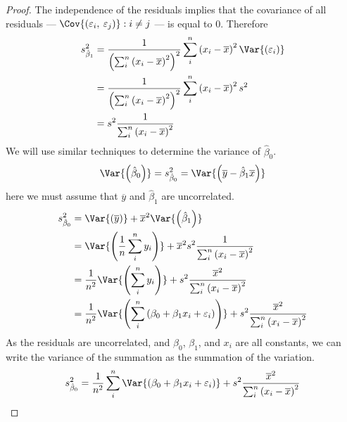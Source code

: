 \documentclass{article}
\begin{document}
\begin{proof}
    The independence of the residuals implies that the covariance of all residuals --- \(\Cov{\left( \varepsilon_i,\: \varepsilon_j \right)}:i \neq j\) --- is equal to 0. Therefore
    \begin{align*}
        s_{\hat{\beta}_1}^2 & = \frac{1}{\left( \sum_i^n \left( x_i - \overline{x} \right)^2 \right)^2} \sum_i^n \left( x_i - \overline{x} \right)^2 \Var{\left( \varepsilon_i \right)} \\
                            & = \frac{1}{\left( \sum_i^n \left( x_i - \overline{x} \right)^2 \right)^2} \sum_i^n \left( x_i - \overline{x} \right)^2 s^2                                \\
                            & = s^2 \frac{1}{\sum_i^n \left( x_i - \overline{x} \right)^2}
    \end{align*}
    We will use similar techniques to determine the variance of \(\hat{\beta}_0\).
    \begin{equation*}
        \Var{\left( \hat{\beta}_0 \right)} = s_{\hat{\beta}_0}^2 = \Var{\left( \overline{y} - \hat{\beta}_1 \overline{x} \right)}
    \end{equation*}
    here we must assume that \(\overline{y}\) and \(\hat{\beta}_1\) are uncorrelated.
    \begin{align*}
        s_{\hat{\beta}_0}^2 & = \Var{\left( \overline{y} \right)} + \overline{x}^2 \Var{\left( \hat{\beta}_1 \right)}                                                                                   \\
                            & = \Var{\left( \frac{1}{n}\sum_i^n y_i \right)} + \overline{x}^2 s^2 \frac{1}{\sum_i^n \left( x_i - \overline{x} \right)^2}                                                \\
                            & = \frac{1}{n^2}\Var{\left( \sum_i^n y_i \right)} + s^2 \frac{\overline{x}^2}{\sum_i^n \left( x_i - \overline{x} \right)^2}                                                \\
                            & = \frac{1}{n^2}\Var{\left( \sum_i^n\left( \beta_0 + \beta_1x_i + \varepsilon_i \right) \right)} + s^2 \frac{\overline{x}^2}{\sum_i^n \left( x_i - \overline{x} \right)^2}
    \end{align*}
    As the residuals are uncorrelated, and \(\beta_0\), \(\beta_1\), and \(x_i\) are all
    constants, we can write the variance of the summation as the summation of the variation.
    \begingroup
    \allowdisplaybreaks{}
    \begin{align*}
        s_{\hat{\beta}_0}^2 & = \frac{1}{n^2} \sum_i^n\Var{\left( \beta_0 + \beta_1x_i + \varepsilon_i \right)} + s^2 \frac{\overline{x}^2}{\sum_i^n \left( x_i - \overline{x} \right)^2}                                                                                        \\

\end{align*}
\end{proof}
\end{document}
